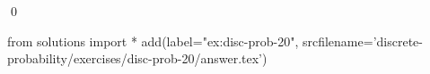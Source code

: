 
\begin{ex} 
  \label{ex:disc-prob-20}
  
  \qed
\end{ex} 
\begin{python0}
from solutions import *
add(label="ex:disc-prob-20",
    srcfilename='discrete-probability/exercises/disc-prob-20/answer.tex') 
\end{python0}
